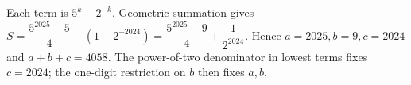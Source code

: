 Each term is $5^k-2^{-k}$. Geometric summation gives $S=\dfrac{5^{2025}-5}{4}-(1-2^{-2024})=\dfrac{5^{2025}-9}{4}+\dfrac{1}{2^{2024}}$. Hence $a=2025,b=9,c=2024$ and $\boxed{a+b+c=4058}$. The power-of-two denominator in lowest terms fixes $c=2024$; the one-digit restriction on $b$ then fixes $a,b$.
